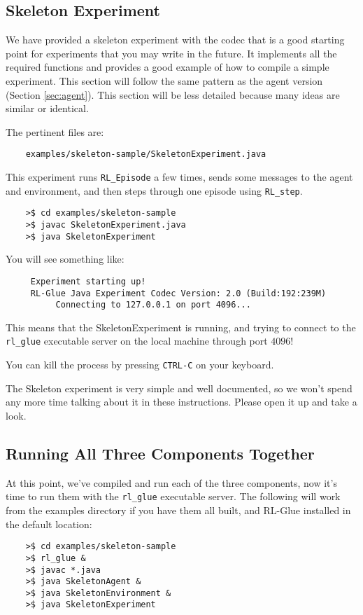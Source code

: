 \documentclass[11pt]{article}
\begin{document}
\subsection{Skeleton Experiment}
We have provided a skeleton experiment with the codec that is a good starting point for experiments that you may write in the future.
It implements all the required functions and provides a good example of how to compile a simple experiment.  This section will follow the same 
pattern as the agent version (Section \ref{sec:agent}).  This section will be less detailed because many ideas are similar or identical.

The pertinent files are:
\begin{verbatim}
	examples/skeleton-sample/SkeletonExperiment.java
\end{verbatim}

This experiment runs \texttt{RL\_Episode} a few times, sends some messages to the agent and environment, and then steps through one episode using \texttt{RL\_step}.

\begin{verbatim}
	>$ cd examples/skeleton-sample
	>$ javac SkeletonExperiment.java
	>$ java SkeletonExperiment
\end{verbatim}

You will see something like:
\begin{verbatim}
     Experiment starting up!
     RL-Glue Java Experiment Codec Version: 2.0 (Build:192:239M)
          Connecting to 127.0.0.1 on port 4096...
\end{verbatim}

This means that the SkeletonExperiment is running, and trying to connect to the \texttt{rl\_glue} executable server on the local machine through port $4096$!  

You can kill the process by pressing \texttt{CTRL-C} on your keyboard.


The Skeleton experiment is very simple and well documented, so we won't spend any more time talking about it in these instructions.
Please open it up and take a look.


\subsection{Running All Three Components Together}
At this point, we've compiled and run each of the three components, now it's time to run them with the \texttt{rl\_glue} executable server.  The following will work from the examples 
directory if you have them all built, and RL-Glue installed in the default location:
\begin{verbatim}
	>$ cd examples/skeleton-sample
	>$ rl_glue &
	>$ javac *.java
	>$ java SkeletonAgent &
	>$ java SkeletonEnvironment &
	>$ java SkeletonExperiment
\end{verbatim}
\end{document}
